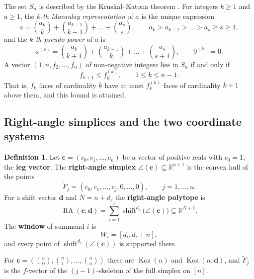 \documentclass[11pt, a4paper, abstract=yes]{scrartcl}
\theoremstyle{definition}
\newtheorem{definition}{Definition}
\theoremstyle{remark}
\theoremstyle{plain}
\newcommand{\vek}[1]{\boldsymbol{#1}}
\theoremstyle{remark}
\theoremstyle{plain}
\newcommand{\Koz}{\operatorname{Koz}}
\newcommand{\shift}{\operatorname{shift}}
\newcommand{\rasimp}{\angle}
\newcommand{\RA}{\operatorname{RA}}
\let\autocite\cite
\begin{document}
The set \(S_n\) is described by the Kruskal--Katona theorem \autocite{Katona1968,Kruskal1963}. For
integers \(k\ge1\) and \(a\ge1\), the \emph{\(k\)-th Macaulay representation} of \(a\) is the unique
expression
\begin{equation}\label{eq:macaulay}
  a=\binom{a_k}k+\binom{a_{k-1}}{k-1}+\dots+\binom{a_s}s,\qquad a_k>a_{k-1}>\dots>a_s\ge s\ge1,
\end{equation}
and the \emph{\(k\)-th pseudo-power} of \(a\) is
\begin{equation}\label{eq:kk}
  a^{(k)}=\binom{a_k}{k+1}+\binom{a_{k-1}}{k}+\dots+\binom{a_s}{s+1},\qquad 0^{(k)}=0 .
\end{equation}
A vector \((1,n,f_2,\dots,f_n)\) of non-negative integers lies in \(S_n\) if and only if
\begin{equation}\label{eq:kk-cond}
  f_{k+1}\le f_k^{(k)},\qquad 1\le k\le n-1 .
\end{equation}
That is, \(f_k\) faces of cardinality \(k\) have at most \(f_k^{(k)}\) faces of cardinality \(k+1\)
above them, and this bound is attained.
\subsection{Right-angle simplices and the two coordinate systems}
\label{sec:org860a5b9}

\begin{definition}
Let \(\vek c=(c_0,c_1,\dots,c_n)\) be a vector of positive reals with \(c_0=1\), the \textbf{leg vector}. The
\textbf{right-angle simplex} \(\rasimp(\vek c)\subseteq\mathbb R^{n+1}\) is the convex hull of the points
\begin{equation}\label{eq:Ftilde}
  \tilde F_j=(c_0,c_1,\dots,c_j,0,\dots,0),\qquad j=1,\dots,n .
\end{equation}
For a shift vector \(\vek d\) and
\(N=n+d_r\) the \textbf{right-angle polytope} is
\begin{equation}\label{eq:ra}
  \RA(\vek c;\vek d)=\sum_{i=1}^r\shift^{d_i}\bigl(\rasimp(\vek c)\bigr)\subseteq\mathbb R^{N+1} .
\end{equation}
The \textbf{window} of summand \(i\) is
\begin{equation}\label{eq:window}
  W_i=[d_i,d_i+n] ,
\end{equation}
and every point of \(\shift^{d_i}(\rasimp(\vek c))\) is supported there.
\label{def-ra}
\end{definition}

For \(\vek c=(\binom n0,\binom n1,\dots,\binom nn)\) these are \(\Koz(n)\) and \(\Koz(n;\vek d)\), and
\(\tilde F_j\) is the \(f\)-vector of the \((j-1)\)-skeleton of the full simplex on \([n]\).
\end{document}
